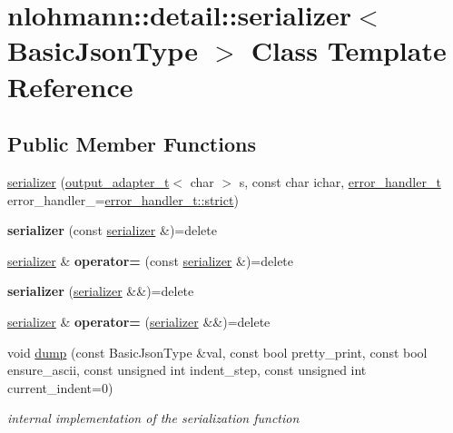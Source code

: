 \hypertarget{classnlohmann_1_1detail_1_1serializer}{}\section{nlohmann\+:\+:detail\+:\+:serializer$<$ Basic\+Json\+Type $>$ Class Template Reference}
\label{classnlohmann_1_1detail_1_1serializer}
\subsection*{Public Member Functions}
\begin{DoxyCompactItemize}
\item 
\mbox{\hyperlink{classnlohmann_1_1detail_1_1serializer_ac010525281d97867ee842da37294fe83}{serializer}} (\mbox{\hyperlink{namespacenlohmann_1_1detail_a9b680ddfb58f27eb53a67229447fc556}{output\+\_\+adapter\+\_\+t}}$<$ char $>$ s, const char ichar, \mbox{\hyperlink{namespacenlohmann_1_1detail_a5a76b60b26dc8c47256a996d18d967df}{error\+\_\+handler\+\_\+t}} error\+\_\+handler\+\_\+=\mbox{\hyperlink{namespacenlohmann_1_1detail_a5a76b60b26dc8c47256a996d18d967dfa2133fd717402a7966ee88d06f9e0b792}{error\+\_\+handler\+\_\+t\+::strict}})
\item 
\mbox{\label{classnlohmann_1_1detail_1_1serializer_ae3771351ec4cb892bec707edeb56dc31}} 
{\bfseries serializer} (const \mbox{\hyperlink{classnlohmann_1_1detail_1_1serializer}{serializer}} \&)=delete
\item 
\mbox{\label{classnlohmann_1_1detail_1_1serializer_a5f14c33012477b9f9876dc54d97009a0}} 
\mbox{\hyperlink{classnlohmann_1_1detail_1_1serializer}{serializer}} \& {\bfseries operator=} (const \mbox{\hyperlink{classnlohmann_1_1detail_1_1serializer}{serializer}} \&)=delete
\item 
\mbox{\label{classnlohmann_1_1detail_1_1serializer_a28081304e70cca6b3042c101ee5c498c}} 
{\bfseries serializer} (\mbox{\hyperlink{classnlohmann_1_1detail_1_1serializer}{serializer}} \&\&)=delete
\item 
\mbox{\label{classnlohmann_1_1detail_1_1serializer_acaafe3436ee5fb74777eb4132a88c513}} 
\mbox{\hyperlink{classnlohmann_1_1detail_1_1serializer}{serializer}} \& {\bfseries operator=} (\mbox{\hyperlink{classnlohmann_1_1detail_1_1serializer}{serializer}} \&\&)=delete
\item 
void \mbox{\hyperlink{classnlohmann_1_1detail_1_1serializer_a95460ebd1a535a543e5a0ec52e00f48b}{dump}} (const Basic\+Json\+Type \&val, const bool pretty\+\_\+print, const bool ensure\+\_\+ascii, const unsigned int indent\+\_\+step, const unsigned int current\+\_\+indent=0)
\begin{DoxyCompactList}\small\item\em internal implementation of the serialization function \end{DoxyCompactList}\end{DoxyCompactItemize}
